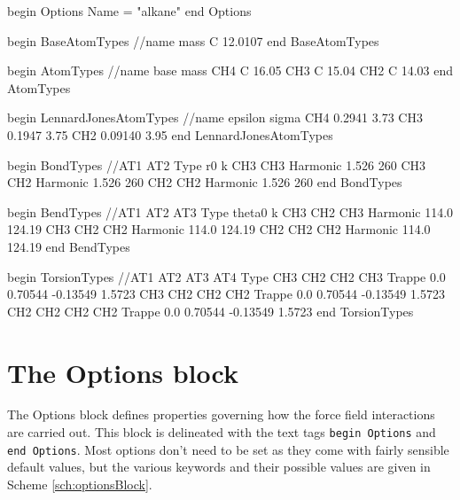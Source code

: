 \documentclass[]{book}
\begin{document}
\begin{code}[caption={[An example of a complete OpenMD
 force field file for straight-chain united-atom alkanes.] An example
 showing a complete OpenMD force field for straight-chain united-atom
 alkanes.}, label={sch:frcExample}] 
begin Options 
  Name = "alkane" 
end Options

begin BaseAtomTypes  
//name          mass  
C               12.0107
end BaseAtomTypes

begin AtomTypes
//name  base    mass
CH4	C	16.05		
CH3	C	15.04		
CH2	C	14.03		
end AtomTypes

begin LennardJonesAtomTypes
//name          epsilon         sigma
CH4       	0.2941          3.73
CH3       	0.1947          3.75
CH2       	0.09140         3.95
end LennardJonesAtomTypes

begin BondTypes
//AT1       AT2 Type                    r0              k
CH3	    CH3	Harmonic		1.526		260
CH3	    CH2	Harmonic		1.526		260
CH2	    CH2	Harmonic		1.526		260
end BondTypes

begin BendTypes
//AT1   AT2     AT3     Type            theta0   k
CH3     CH2     CH3     Harmonic        114.0    124.19
CH3     CH2     CH2     Harmonic        114.0    124.19
CH2     CH2     CH2     Harmonic        114.0    124.19
end BendTypes

begin TorsionTypes
//AT1 AT2  AT3  AT4  Type    
CH3   CH2  CH2  CH3  Trappe  0.0  0.70544  -0.13549  1.5723
CH3   CH2  CH2  CH2  Trappe  0.0  0.70544  -0.13549  1.5723  
CH2   CH2  CH2  CH2  Trappe  0.0  0.70544  -0.13549  1.5723  
end TorsionTypes
\end{code}

\section{\label{section:ffOptions}The Options block}

The Options block defines properties governing how the force field
interactions are carried out.  This block is delineated with the text
tags {\tt begin Options} and {\tt end Options}.  Most options don't
need to be set as they come with fairly sensible default values, but
the various keywords and their possible values are given in Scheme
\ref{sch:optionsBlock}. 
\end{document}
